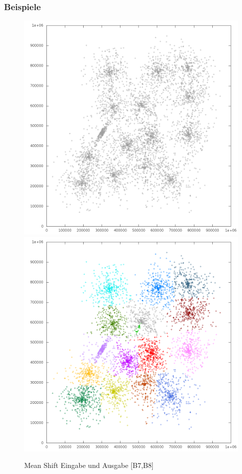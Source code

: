 \documentclass[10pt,utf8]{beamer}
\begin{document}
\begin{frame}
	\frametitle{Beispiele}
	\centering
	\begin{figure}[p!]
		\vspace{-10pt}
		\hspace{-25pt}
		\includegraphics[scale=0.23, keepaspectratio]{../output/pics/s3_black.png}
		\includegraphics[scale=0.23, keepaspectratio]{../output/pics/s3_colored.png}
		\caption{Mean Shift Eingabe und Ausgabe [B7,B8]}
	\end{figure}
\end{frame}
\end{document}
